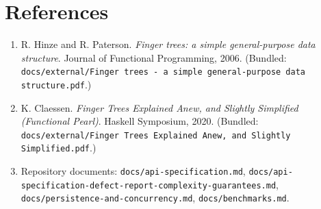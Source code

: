 \documentclass[11pt]{article}
\begin{document}
\section{References}
\label{sec:references}

\begin{enumerate}[leftmargin=1.6em, itemsep=1pt]
  \item R. Hinze and R. Paterson. \emph{Finger trees: a simple general-purpose data structure}. Journal
    of Functional Programming, 2006. (Bundled: \texttt{docs/external/Finger trees - a simple general-purpose
    data structure.pdf}.)
  \item K. Claessen. \emph{Finger Trees Explained Anew, and Slightly Simplified (Functional Pearl)}.
    Haskell Symposium, 2020. (Bundled: \texttt{docs/external/Finger Trees Explained Anew, and Slightly
    Simplified.pdf}.)
  \item Repository documents: \texttt{docs/api-specification.md},
    \texttt{docs/api-specification-defect-report-complexity-guarantees.md},
    \texttt{docs/persistence-and-concurrency.md}, \texttt{docs/benchmarks.md}.
\end{enumerate}
\end{document}
